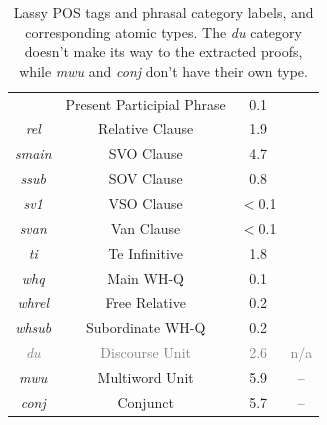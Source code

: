 \begin{table}
\begin{tabularx}{0.925\textwidth}{@{}cccc@{}}
	      \text{ppres} & Present Participial Phrase & 0.1 & \ppres[s]\\
	      \textit{rel} & Relative Clause & 1.9 & \rel[s]\\
	      \textit{smain} & SVO Clause & 4.7 & \smain[s]\\
	      \textit{ssub} & SOV Clause & 0.8 & \ssub[s]\\
	      \textit{sv1} & VSO Clause & $<$0.1& \svi[s]\\
	      \textit{svan} & Van Clause & $<$0.1 & \svan[s]\\
	      \textit{ti} & Te Infinitive & 1.8 & \ti[s]\\
	      \textit{whq} & Main WH-Q & 0.1 & \whq[s]\\
	      \textit{whrel} & Free Relative & 0.2 & \whrel[s]\\
	      \textit{whsub} & Subordinate WH-Q & 0.2 & \whsub[s]\\
	      \textcolor{gray}{\textit{du}} & \textcolor{gray}{Discourse Unit} & \textcolor{gray}{2.6} & \textcolor{gray}{{\small n/a}}\\
	      \textit{mwu} & Multiword Unit & 5.9 & --\\
	      \textit{conj} & Conjunct & 5.7 & --
	\end{tabularx}
	\caption{Lassy POS tags and phrasal category labels, and corresponding atomic types. The \textit{du} category doesn't make its way to the extracted proofs, while \textit{mwu} and \textit{conj} don't have their own type.}
	\label{table:catset}
\end{table}

